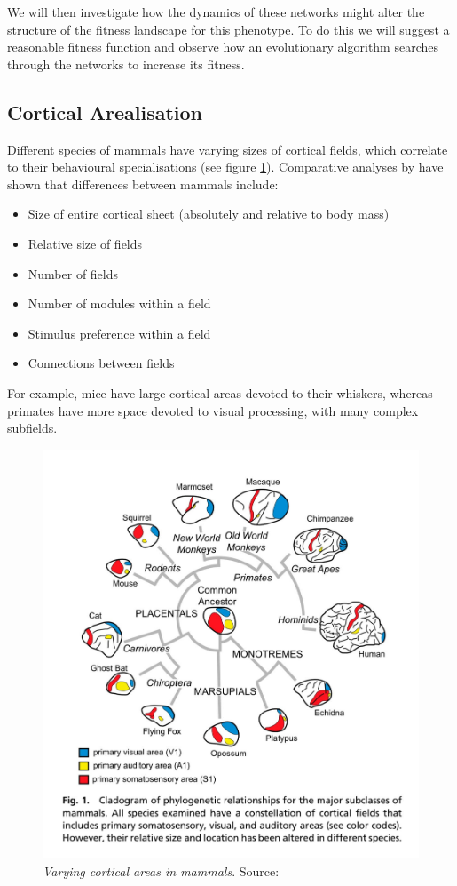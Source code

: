 \documentclass[a4paper,11pt]{article}
\begin{document}
We will then investigate how the dynamics of these networks might alter the structure of the fitness landscape for this phenotype. To do this we will suggest a reasonable fitness function and observe how an evolutionary algorithm searches through the networks to increase its fitness. \par

\subsection{Cortical Arealisation}
Different species of mammals have varying sizes of cortical fields, which correlate to their behavioural specialisations (see figure \ref{fig:mammals}). Comparative analyses by \cite{Krubitzer2013} have shown that differences between mammals include:
\begin{itemize}
	\item Size of entire cortical sheet (absolutely and relative to body mass)
	\item Relative size of fields
	\item Number of fields
	\item Number of modules within a field
	\item Stimulus preference within a field
	\item Connections between fields
\end{itemize}
\par
For example, mice have large cortical areas devoted to their whiskers, whereas primates have more space devoted to visual processing, with many complex subfields.\par

\begin{figure}[h]
  \centering
  \includegraphics[width=\linewidth]{mammals.jpg}
  \caption{\emph{Varying cortical areas in mammals}. Source: \citealp{Krubitzer2012}}
  \label{fig:mammals}
\end{figure}
\end{document}
